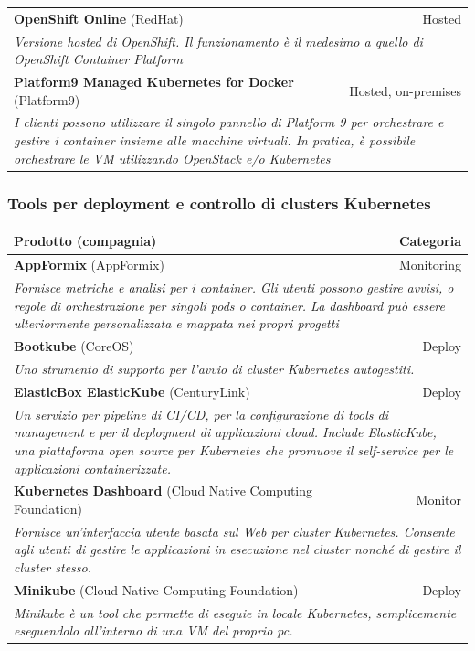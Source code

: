 \documentclass[12pt, a4paper]{report}
\begin{document}
\begin{table}[ht]
\small
\centering
\begin{tabularx}{\textwidth}{|lr|}
\hline
\textbf{OpenShift Online} (RedHat)&Hosted\\
\multicolumn{2}{|X|}{\textit{Versione hosted di OpenShift. Il funzionamento è il medesimo a quello di OpenShift Container Platform}}\\
\hline
\textbf{Platform9 Managed Kubernetes for Docker} (Platform9)&Hosted, on-premises\\
\multicolumn{2}{|X|}{\textit{I clienti possono utilizzare il singolo pannello di Platform 9 per orchestrare e gestire i container insieme alle macchine virtuali. In pratica, è possibile orchestrare le VM utilizzando OpenStack e/o Kubernetes}}\\
\hline
\end{tabularx}
\end{table}

\subsubsection{Tools per deployment e controllo di clusters Kubernetes}
\begin{table}[ht]
\small
\centering
\begin{tabularx}{\textwidth}{|lr|}
\hline
\textbf{Prodotto} (compagnia) & \textbf{Categoria}\\
\hline
\textbf{AppFormix} (AppFormix)&Monitoring\\
\multicolumn{2}{|X|}{\textit{Fornisce metriche e analisi per i container. Gli utenti possono gestire avvisi, o regole di orchestrazione per singoli pods o container. La dashboard può essere ulteriormente personalizzata e mappata nei propri progetti}}\\
\hline
\textbf{Bootkube} (CoreOS)&Deploy\\
\multicolumn{2}{|X|}{\textit{Uno strumento di supporto per l'avvio di cluster Kubernetes autogestiti.}}\\
\hline
\textbf{ElasticBox ElasticKube} (CenturyLink)&Deploy\\
\multicolumn{2}{|X|}{\textit{Un servizio per pipeline di CI/CD, per la configurazione di tools di management e per il deployment di applicazioni cloud. Include ElasticKube, una piattaforma open source per Kubernetes che promuove il self-service per le applicazioni containerizzate.}}\\
\hline
\textbf{Kubernetes Dashboard} (Cloud Native Computing Foundation)&Monitor\\
\multicolumn{2}{|X|}{\textit{Fornisce un'interfaccia utente basata sul Web per cluster Kubernetes. Consente agli utenti di gestire le applicazioni in esecuzione nel cluster nonché di gestire il cluster stesso.}}\\
\hline
\textbf{Minikube} (Cloud Native Computing Foundation)&Deploy\\
\multicolumn{2}{|X|}{\textit{Minikube è un tool che permette di eseguie in locale Kubernetes, semplicemente eseguendolo all'interno di una VM del proprio pc. }}\\
\hline
\end{tabularx}
\end{table}
\end{document}
